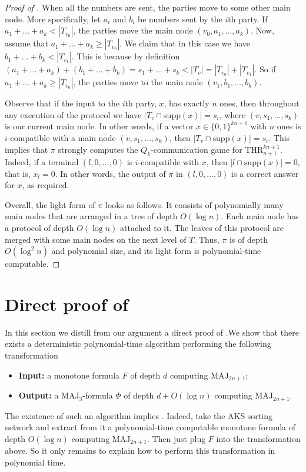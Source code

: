 \documentclass{toc}
\def\MAJ{\mathrm{MAJ}}
\def\THR{\mathrm{THR}}
\begin{document}
\begin{proof}[Proof of ]
When all the numbers are sent, the parties move to some other main node. More specifically, let $a_i$ and $b_i$ be numbers sent by the $i$th party. If $a_1 + \ldots + a_k < |T_{v_0}|$, the parties move the main node $(v_0, a_1, \ldots, a_k)$. Now, assume that $a_1 + \ldots + a_k \ge |T_{v_0}|$. We claim that in this case we have $b_1 + \ldots + b_k < |T_{v_1}|$. This is because by definition $(a_1 + \ldots + a_k) + (b_1 + \ldots + b_k) = s_1 + \ldots + s_k < |T_v| = |T_{v_0}| + |T_{v_1}|$. So if $a_1 + \ldots + a_k \ge |T_{v_0}|$, the parties move to the main node $(v_1, b_1, \ldots, b_k)$.

Observe that if the input to the $i$th party, $x$, has exactly $n$ ones, then throughout any execution of the protocol we have $|T_v\cap\mathrm{supp}(x)| = s_i$, where $(v, s_1, \ldots, s_k)$ is our current main node. In other words, if a vector $x\in\{0, 1\}^{kn + 1}$ with $n$ ones is $i$-compatible with a main node $(v, s_1, \ldots, s_k)$, then $|T_{v}\cap\mathrm{supp}(x)| = s_i$.  This implies that $\pi$ strongly computes the $Q_k$-communication game for $\THR^{kn+1}_{n+1}$. Indeed, if a terminal $(l, 0, \ldots, 0)$ is $i$-compatible with $x$, then $|{l}\cap \mathrm{supp}(x)| = 0$, that is, $x_l = 0$.  In other words, the output of $\pi$ in $(l, 0, \ldots, 0)$ is a correct answer for $x$, as required.




Overall, the light form of $\pi$ looks as follows. 
It consists of polynomially many main nodes that are arranged in 
%
a tree of depth $O(\log n)$.  %
Each main node has %
a protocol of depth $O(\log n)$  %
attached to it. %
The leaves  %
of this protocol are merged with some main nodes on the next level of $T$. Thus, $\pi$ is of depth $O(\log^2 n)$ and polynomial size, and its light form is polynomial-time computable.
\end{proof}







\section{Direct proof of }
\label{sec:direct}
In this section we distill from our argument a direct proof of .We show that there exists a deterministic polynomial-time algorithm performing the following transformation
\begin{itemize}
\item \textbf{Input:} a monotone formula $F$ of depth $d$  computing $\MAJ_{2n + 1}$;
\item \textbf{Output:} a $\MAJ_3$-formula $\Phi$ of depth $d + O(\log n)$ computing $\MAJ_{2n + 1}$.
\end{itemize}
The existence of such an algorithm implies . Indeed, take the AKS sorting network and extract from it a polynomial-time computable %
monotone formula of depth $O(\log n)$  %
computing $\MAJ_{2n + 1}$. Then just 
%
plug $F$  %
into the transformation above. So it only remains to explain how to perform this transformation in polynomial time.
\end{document}
